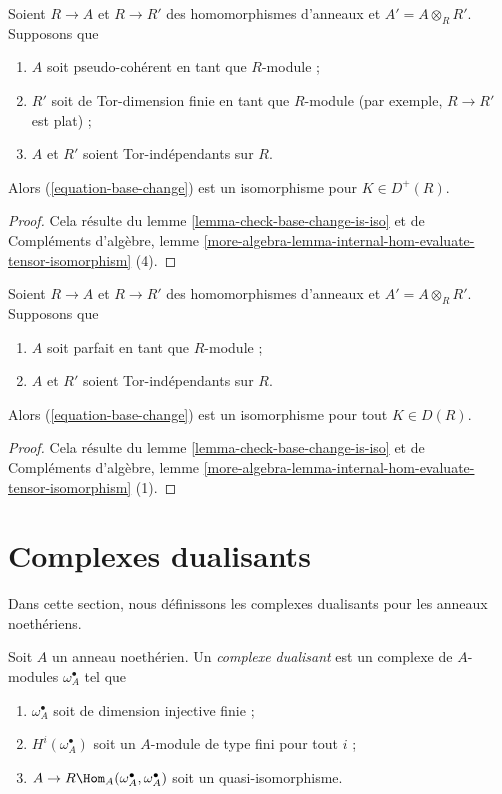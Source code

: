 \begin{lemma}
\label{lemma-flat-bc-surjection}
Soient $R \to A$ et $R \to R'$ des homomorphismes d'anneaux et $A' = A \otimes_R R'$.
Supposons que
\begin{enumerate}
\item $A$ soit pseudo-cohérent en tant que $R$-module ;
\item $R'$ soit de Tor-dimension finie en tant que $R$-module
(par exemple, $R \to R'$ est plat) ;
\item $A$ et $R'$ soient Tor-indépendants sur $R$.
\end{enumerate}
Alors (\ref{equation-base-change}) est un isomorphisme pour $K \in D^+(R)$.
\end{lemma}

\begin{proof}
Cela résulte du lemme \ref{lemma-check-base-change-is-iso} et de
Compléments d'algèbre, lemme \ref{more-algebra-lemma-internal-hom-evaluate-tensor-isomorphism} (4).
\end{proof}

\begin{lemma}
\label{lemma-bc-surjection}
Soient $R \to A$ et $R \to R'$ des homomorphismes d'anneaux et $A' = A \otimes_R R'$.
Supposons que
\begin{enumerate}
\item $A$ soit parfait en tant que $R$-module ;
\item $A$ et $R'$ soient Tor-indépendants sur $R$.
\end{enumerate}
Alors (\ref{equation-base-change}) est un isomorphisme pour tout $K \in D(R)$.
\end{lemma}

\begin{proof}
Cela résulte du lemme \ref{lemma-check-base-change-is-iso} et de
Compléments d'algèbre, lemme \ref{more-algebra-lemma-internal-hom-evaluate-tensor-isomorphism} (1).
\end{proof}







\section{Complexes dualisants}
\label{section-dualizing}

\noindent
Dans cette section, nous définissons les complexes dualisants pour les anneaux noethériens.

\begin{definition}
\label{definition-dualizing}
Soit $A$ un anneau noethérien. Un {\it complexe dualisant}
est un complexe de $A$-modules $\omega_A^\bullet$ tel que
\begin{enumerate}
\item $\omega_A^\bullet$ soit de dimension injective finie ;
\item $H^i(\omega_A^\bullet)$ soit un $A$-module de type fini pour tout $i$ ;
\item $A \to R\Hom_A(\omega_A^\bullet, \omega_A^\bullet)$
soit un quasi-isomorphisme.
\end{enumerate}
\end{definition}

